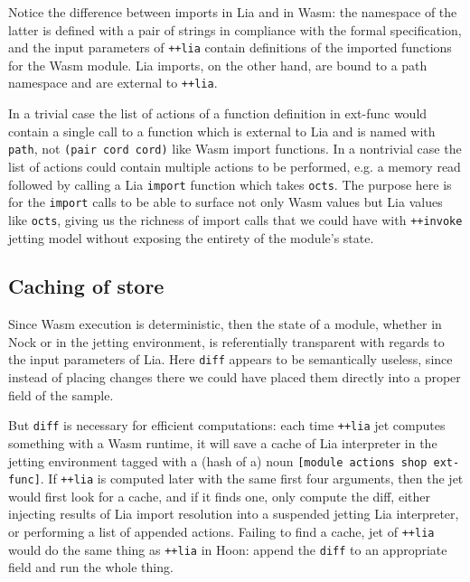 \documentclass[twoside]{article}
\begin{document}
Notice the difference between imports in Lia and in Wasm: the namespace of the latter is defined with a pair of strings in compliance with the formal specification, and the input parameters of \lstinline[style=inlinecode]{++lia} contain definitions of the imported functions for the Wasm module. Lia imports, on the other hand, are bound to a path namespace and are external to \lstinline[style=inlinecode]{++lia}.

In a trivial case the list of actions of a function definition in ext-func would contain a single call to a function which is external to Lia and is named with \lstinline[style=inlinecode]{path}, not \lstinline[style=inlinecode]{(pair cord cord)} like Wasm import functions. In a nontrivial case the list of actions could contain multiple actions to be performed, e.g. a memory read followed by calling a Lia \lstinline[style=inlinecode]{import} function which takes \lstinline[style=inlinecode]{octs}. The purpose here is for the \lstinline[style=inlinecode]{import} calls to be able to surface not only Wasm values but Lia values like \lstinline[style=inlinecode]{octs}, giving us the richness of import calls that we could have with \lstinline[style=inlinecode]{++invoke} jetting model without exposing the entirety of the module's state.

\subsection{Caching of store}

Since Wasm execution is deterministic, then the state of a module, whether in Nock or in the jetting environment, is referentially transparent with regards to the input parameters of Lia. Here \lstinline[style=inlinecode]{diff} appears to be semantically useless, since instead of placing changes there we could have placed them directly into a proper field of the sample.

But \lstinline[style=inlinecode]{diff} is necessary for efficient computations: each time \lstinline[style=inlinecode]{++lia} jet computes something with a Wasm runtime, it will save a cache of Lia interpreter in the jetting environment tagged with a (hash of a) noun \lstinline[style=inlinecode]{[module actions shop ext-func]}. If \lstinline[style=inlinecode]{++lia} is computed later with the same first four arguments, then the jet would first look for a cache, and if it finds one, only compute the diff, either injecting results of Lia import resolution into a suspended jetting Lia interpreter, or performing a list of appended actions. Failing to find a cache, jet of \lstinline[style=inlinecode]{++lia} would do the same thing as \lstinline[style=inlinecode]{++lia} in Hoon: append the \lstinline[style=inlinecode]{diff} to an appropriate field and run the whole thing.
\end{document}

